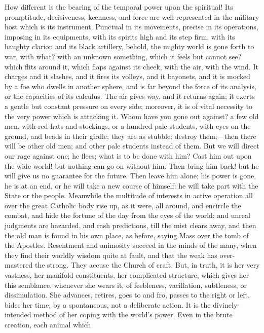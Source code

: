 How different is the bearing of the temporal power upon the
spiritual! Its promptitude, decisiveness, keenness, and force are well
represented in the military host which is its instrument. Punctual in
its movements, precise in its operations, imposing in its equipments,
with its spirits high and its step firm, with its haughty clarion and
its black artillery, behold, the mighty world is gone forth to war,
with what? with an unknown something, which it feels but cannot see?
which flits around it, which flaps against its cheek, with the air,
with the wind. It charges and it slashes, and it fires its volleys,
and it bayonets, and it is mocked by a foe who dwells in another
sphere, and is far beyond the force of its analysis, or the capacities
of its calculus. The air gives way, and it returns again; it exerts a
gentle but constant pressure on every side; moreover, it is of vital
necessity to the very power which is attacking it. Whom have you gone
out against? a few old men, with red hats and stockings, or a hundred
pale students, with eyes on the ground, and beads in their girdle;
they are as stubble; destroy them;—then there will be other old men;
and other pale students instead of them. But we will direct our rage
against one; he flees; what is to be done with him? Cast him out upon
the wide world! but nothing can go on without him. Then bring him
back!
but he will give us no guarantee for the future. Then leave him alone;
his power is gone, he is at an end, or he will take a new course of
himself: he will take part with the State or the people. Meanwhile the
multitude of interests in active operation all over the great Catholic
body rise up, as it were, all around, and encircle the combat, and
hide the fortune of the day from the eyes of the world; and unreal
judgments are hazarded, and rash predictions, till the mist clears
away, and then the old man is found in his own place, as before,
saying Mass over the tomb of the Apostles. Resentment and animosity
succeed in the minds of the many, when they find their worldly wisdom
quite at fault, and that the weak has over-mastered the strong. They
accuse the Church of craft. But, in truth, it is her very vastness,
her manifold constituents, her complicated structure, which gives her
this semblance, whenever she wears it, of feebleness, vacillation,
subtleness, or dissimulation. She advances, retires, goes to and fro,
passes to the right or left, bides her time, by a spontaneous, not a
deliberate action. It is the divinely-intended method of her coping
with the world's power. Even in the brute creation, each animal which
